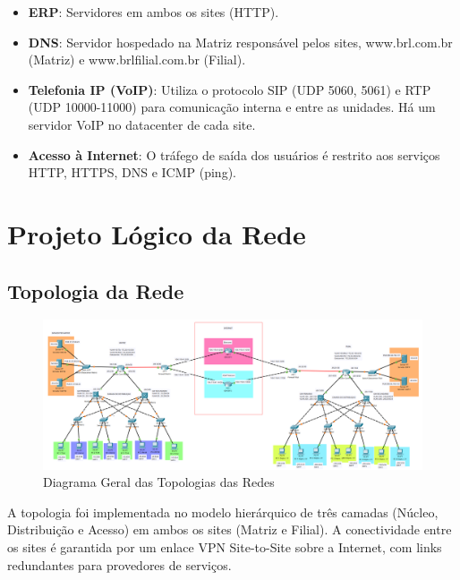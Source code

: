 \documentclass[a4paper, 12pt]{article}
\begin{document}
\begin{itemize}
    \item \textbf{ERP}: Servidores em ambos os sites (HTTP).
    \item \textbf{DNS}: Servidor hospedado na Matriz responsável pelos sites, www.brl.com.br (Matriz) e www.brlfilial.com.br (Filial).
    \item \textbf{Telefonia IP (VoIP)}: Utiliza o protocolo SIP (UDP 5060, 5061) e RTP (UDP 10000-11000) para comunicação interna e entre as unidades. Há um servidor VoIP no datacenter de cada site.
    \item \textbf{Acesso à Internet}: O tráfego de saída dos usuários é restrito aos serviços HTTP, HTTPS, DNS e ICMP (ping).
\end{itemize}

\section{Projeto Lógico da Rede}
\label{sec:projeto-logico}

\subsection{Topologia da Rede}
\label{subsec:topologia}

\begin{figure}[H]
    \centering
    \includegraphics[width=1\linewidth]{geral.png}
        \caption{Diagrama Geral das Topologias das Redes}
    \label{fig:geral}
\end{figure}

A topologia foi implementada no modelo hierárquico de três camadas (Núcleo, Distribuição e Acesso) em ambos os sites (Matriz e Filial). A conectividade entre os sites é garantida por um enlace VPN Site-to-Site sobre a Internet, com links redundantes para provedores de serviços.
\end{document}
